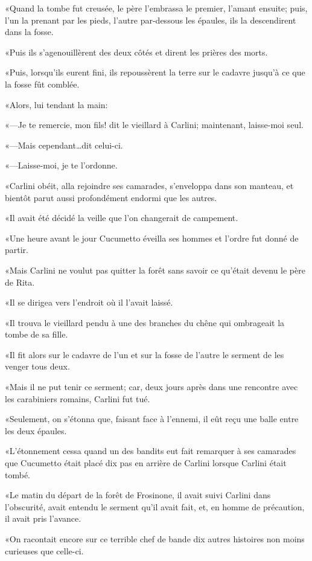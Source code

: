 «Quand la tombe fut creusée, le père l'embrassa le premier, l'amant ensuite; puis, l'un la prenant par les pieds, l'autre par-dessous les épaules, ils la descendirent dans la fosse. 

«Puis ils s'agenouillèrent des deux côtés et dirent les prières des morts. 

«Puis, lorsqu'ils eurent fini, ils repoussèrent la terre sur le cadavre jusqu'à ce que la fosse fût comblée. 

«Alors, lui tendant la main: 

«—Je te remercie, mon fils! dit le vieillard à Carlini; maintenant, laisse-moi seul. 

«—Mais cependant\dots dit celui-ci. 

«—Laisse-moi, je te l'ordonne. 

«Carlini obéit, alla rejoindre ses camarades, s'enveloppa dans son manteau, et bientôt parut aussi profondément endormi que les autres. 

«Il avait été décidé la veille que l'on changerait de campement. 

«Une heure avant le jour Cucumetto éveilla ses hommes et l'ordre fut donné de partir. 

«Mais Carlini ne voulut pas quitter la forêt sans savoir ce qu'était devenu le père de Rita. 

«Il se dirigea vers l'endroit où il l'avait laissé. 

«Il trouva le vieillard pendu à une des branches du chêne qui ombrageait la tombe de sa fille. 

«Il fit alors sur le cadavre de l'un et sur la fosse de l'autre le serment de les venger tous deux. 

«Mais il ne put tenir ce serment; car, deux jours après dans une rencontre avec les carabiniers romains, Carlini fut tué. 

«Seulement, on s'étonna que, faisant face à l'ennemi, il eût reçu une balle entre les deux épaules. 

«L'étonnement cessa quand un des bandits eut fait remarquer à ses camarades que Cucumetto était placé dix pas en arrière de Carlini lorsque Carlini était tombé. 

«Le matin du départ de la forêt de Frosinone, il avait suivi Carlini dans l'obscurité, avait entendu le serment qu'il avait fait, et, en homme de précaution, il avait pris l'avance. 

«On racontait encore sur ce terrible chef de bande dix autres histoires non moins curieuses que celle-ci. 

